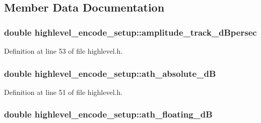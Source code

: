 \subsection{Member Data Documentation}
\subsubsection[{\texorpdfstring{amplitude\+\_\+track\+\_\+d\+Bpersec}{amplitude_track_dBpersec}}]{\setlength{\rightskip}{0pt plus 5cm}double highlevel\+\_\+encode\+\_\+setup\+::amplitude\+\_\+track\+\_\+d\+Bpersec}\hypertarget{structhighlevel__encode__setup_a45038ea755b1204635bc8d93f2527877}{}\label{structhighlevel__encode__setup_a45038ea755b1204635bc8d93f2527877}


Definition at line 53 of file highlevel.\+h.

\subsubsection[{\texorpdfstring{ath\+\_\+absolute\+\_\+dB}{ath_absolute_dB}}]{\setlength{\rightskip}{0pt plus 5cm}double highlevel\+\_\+encode\+\_\+setup\+::ath\+\_\+absolute\+\_\+dB}\hypertarget{structhighlevel__encode__setup_aecc557dc95d32f87df532574ca5205d5}{}\label{structhighlevel__encode__setup_aecc557dc95d32f87df532574ca5205d5}


Definition at line 51 of file highlevel.\+h.

\subsubsection[{\texorpdfstring{ath\+\_\+floating\+\_\+dB}{ath_floating_dB}}]{\setlength{\rightskip}{0pt plus 5cm}double highlevel\+\_\+encode\+\_\+setup\+::ath\+\_\+floating\+\_\+dB}\hypertarget{structhighlevel__encode__setup_ab14fa6d156e75fe4d00f054776129077}{}\label{structhighlevel__encode__setup_ab14fa6d156e75fe4d00f054776129077}


